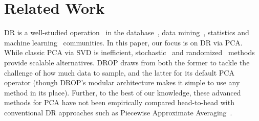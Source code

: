 \section{Related Work}
\label{sec:relwork}
\label{sec:relatedwork}

 DR is a well-studied operation~\cite{dr-survey1,dr-survey2,nonlinear-dr} in the
database~\cite{keogh-indexing,local-dr,charu-ss}, data
mining~\cite{sax,paa}, statistics and machine
learning~\cite{alecton,shamir,bernstein,pca-stoc} communities.
In this paper, our focus is on DR via PCA.
While classic PCA via SVD is inefficient, stochastic~\cite{re-new, shamir} and randomized~\cite{tropp} methods provide scalable alternatives.
DROP draws from both the former to tackle the challenge of how much data to sample, and the latter for its default PCA operator (though DROP's modular architecture makes it simple to use any method in its place). Further, to the best of our knowledge, these advanced methods for PCA have not been empirically compared head-to-head with conventional DR approaches such as Piecewise Approximate Averaging~\cite{paa}.





